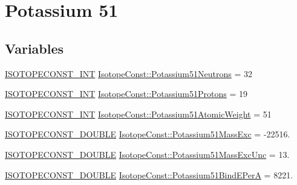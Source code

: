 \hypertarget{group___isotope_const-_potassium-_k51}{}\section{Potassium 51}
\label{group___isotope_const-_potassium-_k51}
\subsection*{Variables}
\begin{DoxyCompactItemize}
\item 
\mbox{\hyperlink{group___isotope_const-_macros_ga5f18360b3e99483a35c32d789e62621c}{I\+S\+O\+T\+O\+P\+E\+C\+O\+N\+S\+T\+\_\+\+I\+NT}} \mbox{\hyperlink{group___isotope_const-_potassium-_k51_gaeeb37c90d61127c5e7b983025bf3062f}{Isotope\+Const\+::\+Potassium51\+Neutrons}} = 32
\item 
\mbox{\hyperlink{group___isotope_const-_macros_ga5f18360b3e99483a35c32d789e62621c}{I\+S\+O\+T\+O\+P\+E\+C\+O\+N\+S\+T\+\_\+\+I\+NT}} \mbox{\hyperlink{group___isotope_const-_potassium-_k51_ga96d453f50607bc9770c85a9c99469606}{Isotope\+Const\+::\+Potassium51\+Protons}} = 19
\item 
\mbox{\hyperlink{group___isotope_const-_macros_ga5f18360b3e99483a35c32d789e62621c}{I\+S\+O\+T\+O\+P\+E\+C\+O\+N\+S\+T\+\_\+\+I\+NT}} \mbox{\hyperlink{group___isotope_const-_potassium-_k51_gabaa577e794fc9906a5abcdd1d1293f93}{Isotope\+Const\+::\+Potassium51\+Atomic\+Weight}} = 51
\item 
\mbox{\hyperlink{group___isotope_const-_macros_ga8f45a7272ce02c0b4c65c44636ed719a}{I\+S\+O\+T\+O\+P\+E\+C\+O\+N\+S\+T\+\_\+\+D\+O\+U\+B\+LE}} \mbox{\hyperlink{group___isotope_const-_potassium-_k51_ga3fae2e24aa4cd406070d7e962e882285}{Isotope\+Const\+::\+Potassium51\+Mass\+Exc}} = -\/22516.
\item 
\mbox{\hyperlink{group___isotope_const-_macros_ga8f45a7272ce02c0b4c65c44636ed719a}{I\+S\+O\+T\+O\+P\+E\+C\+O\+N\+S\+T\+\_\+\+D\+O\+U\+B\+LE}} \mbox{\hyperlink{group___isotope_const-_potassium-_k51_ga8c5704e1a212a7f5d3359a2ca367c016}{Isotope\+Const\+::\+Potassium51\+Mass\+Exc\+Unc}} = 13.
\item 
\mbox{\hyperlink{group___isotope_const-_macros_ga8f45a7272ce02c0b4c65c44636ed719a}{I\+S\+O\+T\+O\+P\+E\+C\+O\+N\+S\+T\+\_\+\+D\+O\+U\+B\+LE}} \mbox{\hyperlink{group___isotope_const-_potassium-_k51_ga5a95ca9d91cced3d84e5223a4df70916}{Isotope\+Const\+::\+Potassium51\+Bind\+E\+PerA}} = 8221.
\item 

\end{DoxyCompactItemize}
